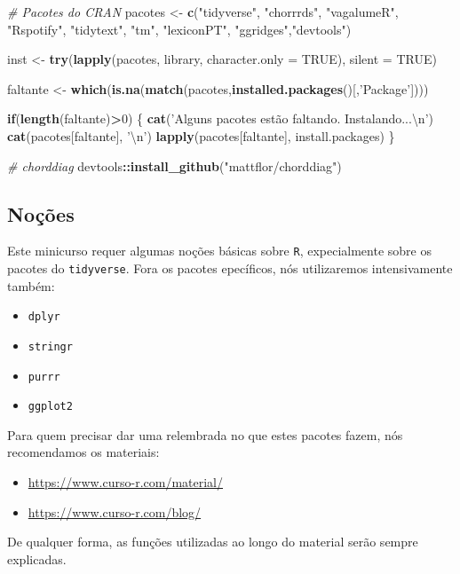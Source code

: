 \documentclass[]{article}
\newenvironment{Shaded}{\begin{snugshade}}{\end{snugshade}}
\newcommand{\CharTok}[1]{\textcolor[rgb]{0.31,0.60,0.02}{#1}}
\newcommand{\CommentTok}[1]{\textcolor[rgb]{0.56,0.35,0.01}{\textit{#1}}}
\newcommand{\ControlFlowTok}[1]{\textcolor[rgb]{0.13,0.29,0.53}{\textbf{#1}}}
\newcommand{\DataTypeTok}[1]{\textcolor[rgb]{0.13,0.29,0.53}{#1}}
\newcommand{\DecValTok}[1]{\textcolor[rgb]{0.00,0.00,0.81}{#1}}
\newcommand{\KeywordTok}[1]{\textcolor[rgb]{0.13,0.29,0.53}{\textbf{#1}}}
\newcommand{\NormalTok}[1]{#1}
\newcommand{\OperatorTok}[1]{\textcolor[rgb]{0.81,0.36,0.00}{\textbf{#1}}}
\newcommand{\OtherTok}[1]{\textcolor[rgb]{0.56,0.35,0.01}{#1}}
\newcommand{\StringTok}[1]{\textcolor[rgb]{0.31,0.60,0.02}{#1}}
\providecommand{\tightlist}{%
  \setlength{\itemsep}{0pt}\setlength{\parskip}{0pt}}
\begin{document}
\begin{Shaded}
\begin{Highlighting}[]
\CommentTok{# Pacotes do CRAN}
\NormalTok{pacotes <-}\StringTok{ }\KeywordTok{c}\NormalTok{(}\StringTok{"tidyverse"}\NormalTok{, }\StringTok{"chorrrds"}\NormalTok{, }\StringTok{"vagalumeR"}\NormalTok{, }\StringTok{"Rspotify"}\NormalTok{, }
             \StringTok{"tidytext"}\NormalTok{, }\StringTok{"tm"}\NormalTok{, }\StringTok{"lexiconPT"}\NormalTok{, }\StringTok{"ggridges"}\NormalTok{,}\StringTok{"devtools"}\NormalTok{)}

\NormalTok{inst <-}\StringTok{  }\KeywordTok{try}\NormalTok{(}\KeywordTok{lapply}\NormalTok{(pacotes, library, }\DataTypeTok{character.only =} \OtherTok{TRUE}\NormalTok{),}
             \DataTypeTok{silent =} \OtherTok{TRUE}\NormalTok{)}
  
\NormalTok{faltante <-}\StringTok{  }\KeywordTok{which}\NormalTok{(}\KeywordTok{is.na}\NormalTok{(}\KeywordTok{match}\NormalTok{(pacotes,}\KeywordTok{installed.packages}\NormalTok{()[,}\StringTok{'Package'}\NormalTok{])))}

\ControlFlowTok{if}\NormalTok{(}\KeywordTok{length}\NormalTok{(faltante)}\OperatorTok{>}\DecValTok{0}\NormalTok{) \{}
  \KeywordTok{cat}\NormalTok{(}\StringTok{'Alguns pacotes estão faltando. Instalando...}\CharTok{\textbackslash{}n}\StringTok{'}\NormalTok{)}
  \KeywordTok{cat}\NormalTok{(pacotes[faltante], }\StringTok{'}\CharTok{\textbackslash{}n}\StringTok{'}\NormalTok{)}
  \KeywordTok{lapply}\NormalTok{(pacotes[faltante], install.packages)}
\NormalTok{\}}

\CommentTok{# chorddiag}
\NormalTok{devtools}\OperatorTok{::}\KeywordTok{install_github}\NormalTok{(}\StringTok{"mattflor/chorddiag"}\NormalTok{)}
\end{Highlighting}
\end{Shaded}

\hypertarget{nocoes}{%
\subsection{Noções}\label{nocoes}}

Este minicurso requer algumas noções básicas sobre \texttt{R},
expecialmente sobre os pacotes do \texttt{tidyverse}. Fora os pacotes
epecíficos, nós utilizaremos intensivamente também:

\begin{itemize}
\tightlist
\item
  \texttt{dplyr}
\item
  \texttt{stringr}
\item
  \texttt{purrr}
\item
  \texttt{ggplot2}
\end{itemize}

Para quem precisar dar uma relembrada no que estes pacotes fazem, nós
recomendamos os materiais:

\begin{itemize}
\tightlist
\item
  \url{https://www.curso-r.com/material/}
\item
  \url{https://www.curso-r.com/blog/}
\end{itemize}

De qualquer forma, as funções utilizadas ao longo do material serão
sempre explicadas.
\end{document}
